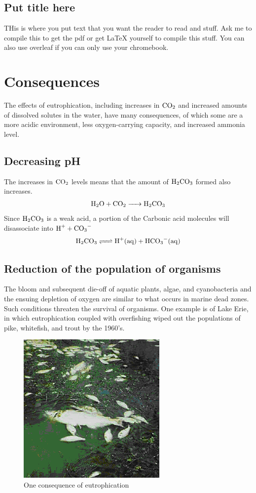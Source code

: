 \documentclass{article}
\begin{document}
    \subsection{Put title here}
    THis is where you put text that you want the reader to read and stuff.
    Ask me to compile this to get the pdf or get \LaTeX { } yourself to compile this stuff.
    You can also use overleaf if you can only use your chromebook.
\section{Consequences}
The effects of eutrophication, including increases in $\ce{CO2}$ and increased amounts of dissolved solutes in the water, have many consequences, of which some are a more acidic environment, less oxygen-carrying capacity, and increased ammonia level.
    \subsection{Decreasing pH}
    The increases in $\ce{CO2}$ levels means that the amount of $\ce{H2CO3}$ formed also increases. 
    \begin{align}
        \ce{H2O + CO2 -> H2CO3}
    \end{align}
    Since $\ce{H2CO3}$ is a weak acid, a portion of the Carbonic acid molecules will disassociate into $\ce{H+ + CO3-}$
    \begin{align}
        \ce{H2CO3 <=> H+(aq) + HCO3-(aq)}
    \end{align}
    \newpage
    \subsection{Reduction of the population of organisms}
    The bloom and subsequent die-off of aquatic plants, algae, and cyanobacteria and the ensuing depletion of oxygen are similar to what occurs in marine dead zones. 
    Such conditions threaten the survival of organisms. One example is of Lake Erie, in which eutrophication coupled with overfishing wiped out the populations of pike, whitefish, and trout by the 1960's\cite{bio}.
        \begin{figure}[h]
            \centering
            \includegraphics{deadfish}
            \caption{One consequence of eutrophication}
            \label{fig:deadfish}
        \end{figure}
\newpage
\printbibliography[heading=bibintoc]
\end{document}
